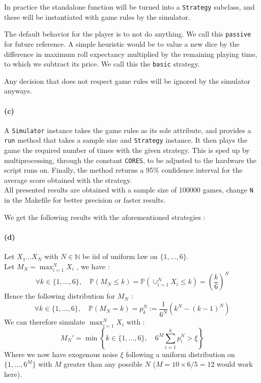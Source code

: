 \documentclass{article}
\newcommand{\dice}{\{1,\dots,6\}}
\renewcommand{\P}{\mathbb P}
\newcommand{\getoutput}[1]{}
\begin{document}
    In practice the standalone function will be turned into a
    \texttt{Strategy} subclass, and these will be instantiated with
    game rules by the simulator.

    The default behavior for the player is to not do anything.
    We call this \texttt{passive} for future reference.
    A simple heuristic would be to value a new dice by
    the difference in maximum roll expectancy multiplied by the remaining
    playing time, to which we subtract its price.
    We call this the \texttt{basic} strategy.

    Any decision that does not respect game rules will be ignored by the simulator anyways.


    \paragraph{(c)}
    A \texttt{Simulator} instance takes the game rules as its sole
    attribute, and provides a \texttt{run} method that takes a
    sample size and \texttt{Strategy} instance.
    It then plays the game the required number of times with the given strategy.
    This is sped up by multiprocessing, through the constant \texttt{CORES},
    to be adjusted to the hardware the script runs on.
    Finally, the method returns a 95\% confidence interval for the average
    score obtained with the strategy.\\
    All presented results are obtained with a sample size of 100000 games,
    change \texttt{N} in the Makefile for better precision or faster results.

    We get the following results with the aforementioned strategies :
    \getoutput{1c}


    \paragraph{(d)}
    Let $X_1\dots X_N$ with $N\in\mathbb N$ be iid of uniform law on $\dice$.\\
    Let $M_N=\max_{i=1}^NX_i$ , we have :
    \begin{equation}
        \forall k\in\dice,\quad
        \mathbb{P}(M_N\leq k)=\P\left(\cup_{i=1}^NX_i\leq k\right)
        =\left(\frac{k}{6}\right)^N
    \end{equation}
    Hence the following distribution for $M_N$ :
    \begin{equation}
        \forall k\in\dice,\quad
        \mathbb{P}(M_N=k)=p^N_k:=\frac{1}{6^N}\left(k^N-(k-1)^N\right)
    \end{equation}
    We can therefore simulate $\max_{i=1}^NX_i$ with :
    \begin{equation}
        M_N'=\min\left\{
            k\in\dice,\quad6^M\sum_{i=1}^kp^N_i>\xi
        \right\}
    \end{equation}
    Where we now have exogenous noise $\xi$ following a uniform distribution on
    $\{1,\dots,6^M\}$ with $M$ greater than any possible $N$
    ($M=10\times6/5=12$ would work here).
\end{document}
